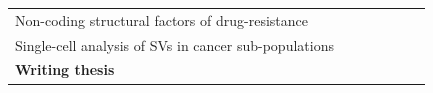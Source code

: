 \documentclass[twoside,fontsize=12pt]{article}
\begin{document}
\begin{table}[h]
\begin{center}
\begin{tabular}{lllllll}
\hspace*{1em} Non-coding structural factors of drug-resistance                                                        &                                                 &                                                 &                        & \cellcolor[HTML]{656565}                  & \cellcolor[HTML]{656565}                     &                    \\
\hspace*{1em} Single-cell analysis of SVs in cancer sub-populations                                                       &                                                 &                                                 &                        &                & \cellcolor[HTML]{656565}                     & \cellcolor[HTML]{656565}                   \\

\textbf{Writing thesis}                         &                                                 &                                                 &                                                 &                                                 &                                                                        & \cellcolor[HTML]{343434}                       
\end{tabular}
\end{center}
\end{table}





%
%
%
%
%
%
%
%
\end{document}

